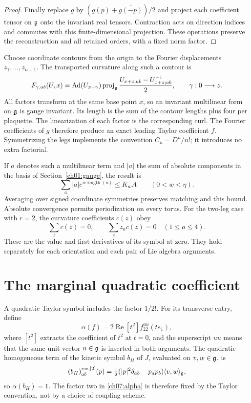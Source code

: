 \begin{proof}
Finally replace $g$ by $(g(p)+\overline{g(-p)})/2$ and project each
coefficient tensor on $\mathfrak g$ onto the invariant real tensors. Contraction acts
on direction indices and commutes with this finite-dimensional
projection. These operations preserve the reconstruction and all
retained orders, with a fixed norm factor.
\end{proof}

Choose coordinate contours from the origin to the Fourier displacements
$z_1,\ldots,z_{n-1}$. The transported curvature along such a
contour is
\begin{equation}\label{ch07:slot}
 F_{\gamma,ab}(U,x)=\operatorname{Ad}(U_{x+\gamma})
 \operatorname{proj}_{\mathfrak g}\frac{U_{x+z;ab}-U_{x+z;ab}^{-1}}2,
 \qquad \gamma:0\longrightarrow z.
\end{equation}
All factors transform at the same base point $x$, so an invariant
multilinear form on $\mathfrak g$ is gauge invariant. Its length is the
sum of the contour lengths plus four per plaquette. The linearization of
each factor is the corresponding curl. The Fourier coefficients of
$g$ therefore produce an exact leading Taylor coefficient $f$.
Symmetrizing the legs implements the convention $C_n=D^n/n!$;
it introduces no extra factorial.

If $a$ denotes such a multilinear term and $|a|$ the sum of absolute
components in the basis of Section~\ref{ch01:gauge}, the result is
\begin{equation}\label{ch07:path-norm}
 \sum_a |a|e^{w\operatorname{length}(a)}\le K_w A
 \qquad(0<w<\eta).
\end{equation}
Averaging over signed coordinate symmetries preserves matching and this
bound. Absolute convergence permits periodization on every torus.
For the two-leg case with $r=2$, the curvature coefficients $c(z)$ obey
\begin{equation}\label{ch07:moments}
 \sum_zc(z)=0,\qquad \sum_z z_ac(z)=0\quad(1\le a\le4).
\end{equation}
These are the value and first derivatives of its symbol at zero.
They hold separately for each orientation and each pair of Lie algebra arguments.

\section{The marginal quadratic coefficient}\label{ch07:quadratic}

A quadratic Taylor symbol includes the factor $1/2!$. For its transverse
entry, define
\begin{equation}\label{ch07:alpha}
 \alpha(f)=2\operatorname{Re}[t^2]f_{22}^{uu}(te_1),
\end{equation}
where $[t^2]$ extracts the coefficient of $t^2$ at $t=0$, and the
superscript $uu$ means that the same unit vector $u\in\mathfrak g$ is inserted in
both arguments. The quadratic homogeneous term of the kinetic symbol $b_H$
of $J$, evaluated on $v,w\in\mathfrak g$, is
\[
 (b_H)_{ab}^{vw,[2]}(p)=\tfrac12
 (|p|^2\delta_{ab}-p_ap_b)\langle v,w\rangle_{\mathfrak g},
\]
so $\alpha(b_H)=1$. The factor two in \eqref{ch07:alpha} is therefore
fixed by the Taylor convention, not by a choice of coupling scheme.

